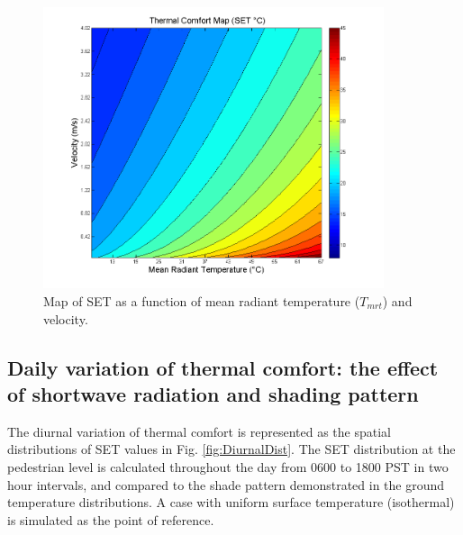 \documentclass[smallextended]{svjour3}
\begin{document}
\begin{figure}[!h]
\graphicspath{ {image/} }
\centerline{\includegraphics[width=10cm]{vel_mrt_map.png}}
\caption{Map of SET as a function of mean radiant temperature ($T_{mrt}$) and velocity.}
\label{Fig.mapTV}
\end{figure}

\subsection{Daily variation of thermal comfort: the effect of shortwave radiation and shading pattern}
The diurnal variation of thermal comfort is represented as the spatial distributions of SET values in Fig. \ref{fig:DiurnalDist}.  The SET distribution at the pedestrian level is calculated throughout the day from 0600 to 1800 PST in two hour intervals, and compared to the shade pattern demonstrated in the ground temperature distributions. A case with uniform surface temperature (isothermal) is simulated as the  point of reference. 
\end{document}
